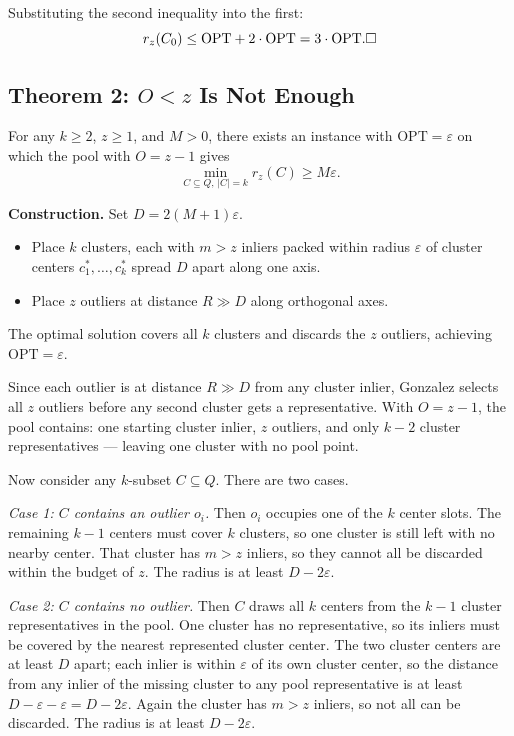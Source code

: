 \documentclass[11pt]{article}
\begin{document}
Substituting the second inequality into the first:
\[
r_z(C_0) \le \mathrm{OPT} + 2 \cdot \mathrm{OPT} = 3 \cdot \mathrm{OPT}. \hfill\square
\]

\subsection{Theorem 2: $O < z$ Is Not Enough}

For any $k \ge 2$, $z \ge 1$, and $M > 0$, there exists an instance with $\mathrm{OPT} = \varepsilon$ on which the pool with $O = z - 1$ gives
\[
\min_{C \subseteq Q,\,|C|=k} r_z(C) \ge M\varepsilon.
\]

\textbf{Construction.} Set $D = 2(M{+}1)\varepsilon$.
\begin{itemize}
    \item Place $k$ clusters, each with $m > z$ inliers packed within radius $\varepsilon$ of cluster centers $c^*_1, \dots, c^*_k$ spread $D$ apart along one axis.
    \item Place $z$ outliers at distance $R \gg D$ along orthogonal axes.
\end{itemize}

The optimal solution covers all $k$ clusters and discards the $z$ outliers, achieving $\mathrm{OPT} = \varepsilon$.

Since each outlier is at distance $R \gg D$ from any cluster inlier, Gonzalez selects all $z$ outliers before any second cluster gets a representative. With $O = z-1$, the pool contains: one starting cluster inlier, $z$ outliers, and only $k-2$ cluster representatives --- leaving one cluster with no pool point.

Now consider any $k$-subset $C \subseteq Q$. There are two cases.

\textit{Case 1: $C$ contains an outlier $o_i$.} Then $o_i$ occupies one of the $k$ center slots. The remaining $k-1$ centers must cover $k$ clusters, so one cluster is still left with no nearby center. That cluster has $m > z$ inliers, so they cannot all be discarded within the budget of $z$. The radius is at least $D - 2\varepsilon$.

\textit{Case 2: $C$ contains no outlier.} Then $C$ draws all $k$ centers from the $k-1$ cluster representatives in the pool. One cluster has no representative, so its inliers must be covered by the nearest represented cluster center. The two cluster centers are at least $D$ apart; each inlier is within $\varepsilon$ of its own cluster center, so the distance from any inlier of the missing cluster to any pool representative is at least $D - \varepsilon - \varepsilon = D - 2\varepsilon$. Again the cluster has $m > z$ inliers, so not all can be discarded. The radius is at least $D - 2\varepsilon$.
\end{document}
